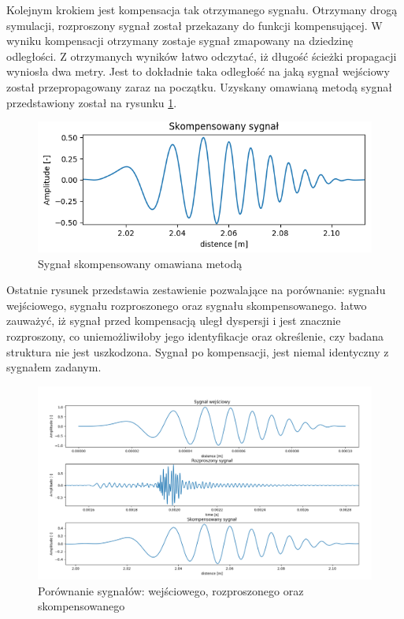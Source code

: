 Kolejnym krokiem jest kompensacja tak otrzymanego sygnału. Otrzymany drogą symulacji, rozproszony sygnał został przekazany do funkcji kompensującej. W wyniku kompensacji otrzymany zostaje sygnał zmapowany na dziedzinę odległości. Z otrzymanych wyników łatwo odczytać, iż długość ścieżki propagacji wyniosła dwa metry. Jest to dokładnie taka odległość na jaką sygnał wejściowy został przepropagowany zaraz na początku. Uzyskany omawianą metodą sygnał przedstawiony został na rysunku \ref{fig:skompensowanysygnal}.

\begin{figure}[h]
\centering
\includegraphics[width=14cm]{Zdjecia/4/sygnalskompensowany}
\caption{Sygnał skompensowany omawiana metodą}
\label{fig:skompensowanysygnal}
\end{figure}

Ostatnie rysunek przedstawia zestawienie pozwalające na porównanie: sygnału wejściowego, sygnału rozproszonego oraz sygnału skompensowanego. łatwo zauważyć, iż sygnał przed kompensacją uległ dyspersji i jest znacznie rozproszony, co uniemożliwiłoby jego identyfikacje oraz określenie, czy badana struktura nie jest uszkodzona. Sygnał po kompensacji, jest niemal identyczny z sygnałem zadanym. 

\begin{figure}[h]
\centering
\includegraphics[width=14cm]{Zdjecia/4/porownaniewszystkichsygnalow}
\caption{Porównanie sygnałów: wejściowego, rozproszonego oraz skompensowanego}
\label{fig:porownaniewszystkich}
\end{figure}

